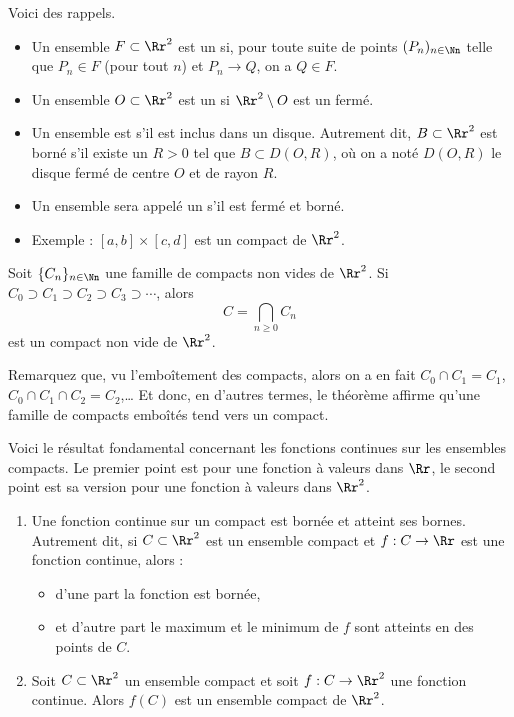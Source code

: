 \documentclass[11pt,class=report,crop=false]{standalone}
\begin{document}
Voici des rappels.

\begin{itemize}
  \item Un ensemble $F\subset \Rr^2$ est un  si, pour toute suite de points $(P_n)_{n\in\Nn}$
telle que $P_n \in F$ (pour tout $n$) et $P_n \to Q$, on a $Q\in F$.
  \item Un ensemble $O \subset \Rr^2$ est un  si $\Rr^2 \setminus O$ est un fermé.
  \item Un ensemble est  s'il est inclus dans un disque. 
Autrement dit, $B \subset \Rr^2$  est borné s'il existe un $R>0$ tel que $B \subset D(O,R)$, où
on a noté $D(O,R)$ le disque fermé de centre $O$ et de rayon $R$.
  \item Un ensemble sera appelé un  s'il est fermé et borné.
  \item Exemple : $[a,b] \times [c,d]$ est un compact de $\Rr^2$.
\end{itemize}


\begin{theoreme}
\label{th:intersectioncompacts}
Soit $\{ C_n\}_{n\in \Nn}$ une famille de compacts non vides de $\Rr^2$.
Si $C_0 \supset C_1 \supset C_2 \supset C_3 \supset \cdots$, alors 
$$C = \bigcap_{n\ge0} C_n$$
est un compact non vide de $\Rr^2$.
\end{theoreme}



Remarquez que, vu l’emboîtement des compacts, alors on a en fait
$C_0\cap C_1=C_1$, $C_0\cap C_1\cap C_2=C_2$,\ldots
Et donc, en d'autres termes, le théorème affirme qu'une famille de compacts emboîtés
tend vers un compact.

\bigskip

Voici le résultat fondamental concernant les fonctions continues sur les ensembles compacts. Le premier
point est pour une fonction à valeurs dans $\Rr$, le second point est sa version pour une fonction à valeurs dans $\Rr^2$.
\begin{theoreme}
\sauteligne
\begin{enumerate}
  \item Une fonction continue sur un compact est bornée et atteint ses bornes.
Autrement dit, si $C \subset \Rr^2$ est un ensemble compact et  $f : C  \to \Rr$ est une fonction continue,
alors :
  \begin{itemize}
    \item d'une part la fonction est bornée, 
    \item et d'autre part le maximum et le minimum de $f$ sont atteints en des points de $C$.
  \end{itemize}
 
  \item Soit $C \subset \Rr^2$ un ensemble compact et soit $f : C  \to \Rr^2$ une fonction continue.
Alors $f(C)$ est un ensemble compact de $\Rr^2$.
\end{enumerate}
\end{theoreme}
\end{document}
